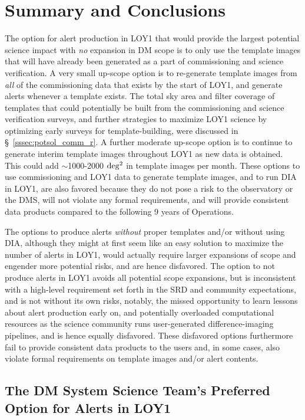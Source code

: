 \documentclass[DM,toc]{lsstdoc}
\begin{document}
\clearpage
\section{Summary and Conclusions}\label{sec:rec}

The option for alert production in LOY1 that would provide the largest potential science impact with {\em no} expansion in DM scope is to only use the template images that will have already been generated as a part of commissioning and science verification.
A very small up-scope option is to re-generate template images from {\em all} of the commissioning data that exists by the start of LOY1, and generate alerts whenever a template exists.
The total sky area and filter coverage of templates that could potentially be built from the commissioning and science verification surveys, and further strategies to maximize LOY1 science by optimizing early surveys for template-building, were discussed in \S~\ref{sssec:potsol_comm_r}.
A further moderate up-scope option is to continue to generate interim template images throughout LOY1 as new data is obtained.
This could add $\sim$1000-2000 $\rm deg^2$ in template images per month.
These options to use commissioning and LOY1 data to generate template images, and to run DIA in LOY1, are also favored because they do not pose a risk to the observatory or the DMS, will not violate any formal requirements, and will provide consistent data products compared to the following 9 years of Operations. 

The options to produce alerts {\it without} proper templates and/or without using DIA, although they might at first seem like an easy solution to maximize the number of alerts in LOY1, would actually require larger expansions of scope and engender more potential risks, and are hence disfavored.
The  option to not produce alerts in LOY1 avoids all potential scope expansions, but is inconsistent with a high-level requirement set forth in the SRD and community expectations, and is not without its own risks, notably,  the missed opportunity to learn lessons about alert production early on, and potentially overloaded computational resources as the science community runs user-generated difference-imaging pipelines, and is hence equally disfavored. 
These disfavored options furthermore fail to provide consistent data products to the users and, in some cases, also violate formal requirements on template images and/or alert contents.

\subsection{The DM System Science Team's Preferred Option for Alerts in LOY1}
\end{document}
